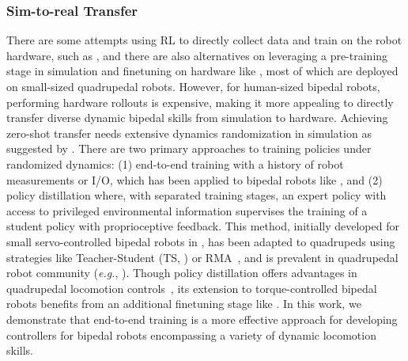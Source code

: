 \subsubsection{Sim-to-real Transfer}
There are some attempts using RL to directly collect data and train on the robot hardware, such as \cite{haarnoja2019learning,wu2023daydreamer,smith2023demonstrating}, and there are also alternatives on leveraging a pre-training stage in simulation and finetuning on hardware like \cite{peng2020learning,smith2022legged,westenbroek2022lyapunov}, most of which are deployed on small-sized quadrupedal robots.
However, for human-sized bipedal robots, performing hardware rollouts is expensive, making it more appealing to directly transfer diverse dynamic bipedal skills from simulation to hardware.
Achieving zero-shot transfer needs extensive dynamics randomization in simulation as suggested by \cite{peng2018sim,peng2020learning}. 
There are two primary approaches to training policies under randomized dynamics: (1) end-to-end training with a history of robot measurements or I/O, which has been applied to bipedal robots like \cite{siekmann2020learning,siekmann2021sim,li2021reinforcement}, and (2) policy distillation where, with separated training stages, an expert policy with access to privileged environmental information supervises the training of a student policy with proprioceptive feedback. This method, initially developed for small servo-controlled bipedal robots in \cite{yu2019sim}, has been adapted to quadrupeds using strategies like Teacher-Student (TS, \cite{lee2020learning}) or RMA~\citep{kumar2021rma}, and is prevalent in quadrupedal robot community (\textit{e.g.}, \cite{fu2021minimizing,ji2022concurrent,margolis2023walk}). Though policy distillation offers advantages in quadrupedal locomotion controls~\citep{kumar2021rma}, its extension to torque-controlled bipedal robots benefits from an additional finetuning stage like \cite{kumar2022adapting}.
In this work, we demonstrate that end-to-end training is a more effective approach for developing controllers for bipedal robots encompassing a variety of dynamic locomotion skills.

